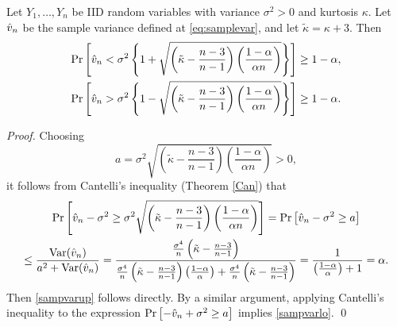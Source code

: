 \documentclass{article}
\begin{document}
\begin{prop}\label{propCant} 
Let $Y_1,\dots,Y_n$ be IID random variables with variance
$\sigma^2>0$ and kurtosis $\kappa$.
Let $\hat{v}_n$ be the sample variance 
defined at \eqref{eq:samplevar}, and let $\tilde\kappa=\kappa+3$.  Then
\begin{subequations} \label{sampvarbd}
\begin{gather}\label{sampvarup}
\Pr\left[\hat{v}_n < \sigma^2 \left\{1 + \sqrt{\left ( \tilde\kappa  - \frac{n-3}{n-1}\right)\left(\frac{1-\alpha}{\alpha n}\right)}\right\} \right] \ge 1 - \alpha, \\
\label{sampvarlo}
\Pr\left[\hat{v}_n > \sigma^2 \left\{1 - \sqrt{\left ( \tilde\kappa  - \frac{n-3}{n-1}\right)\left(\frac{1-\alpha}{\alpha n}\right)}\right\} \right] \ge 1 - \alpha.
\end{gather}
\end{subequations}
\end{prop}
\begin{proof}Choosing
$$a=\sigma^2\sqrt{\left(\tilde\kappa-\frac{n-3}{n-1}\right)\left(\frac{1-\alpha}{\alpha n}\right)} >0,
$$
it follows from Cantelli's inequality (Theorem \ref{Can})  that
\begin{multline*}
\Pr\left[\hat{v}_n-\sigma^2 \geq
\sigma^2\sqrt{\left(\tilde\kappa-\frac{n-3}{n-1}\right)\left(\frac{1-\alpha}{\alpha n}\right)} \right]  = \Pr\left[\hat{v}_n-\sigma^2 \geq
a \right]\\
 \leq\frac{\mathrm{Var}(\hat{v}_n)}{a^2+\mathrm{Var}(\hat{v}_n)} 
= \frac{\frac{\sigma^4}{n}\left(\tilde\kappa - \frac{n-3}{n-1}\right)}{\frac{\sigma^4}{n}\left(\tilde\kappa - \frac{n-3}{n-1}\right)\left(\frac{1-\alpha}{\alpha}\right)+\frac{\sigma^4}{n}\left(\tilde\kappa - \frac{n-3}{n-1}\right)} 
=\frac{1}{\left(\frac{1-\alpha}{\alpha}\right)+1}=\alpha.
\end{multline*}
Then \eqref{sampvarup} follows directly.  By a similar argument, applying Cantelli's inequality to the expression $\Pr\left[-\hat{v}_n+\sigma^2 \ge a \right]$ implies  \eqref{sampvarlo}. \qed
\end{proof}
\end{document}
